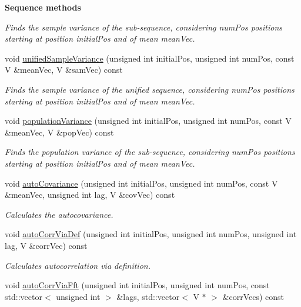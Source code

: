 \begin{Indent}{\bf Sequence methods}
\begin{DoxyCompactItemize}
\begin{DoxyCompactList}\small\item\em Finds the sample variance of the sub-\/sequence, considering {\ttfamily num\-Pos} positions starting at position {\ttfamily initial\-Pos} and of mean {\ttfamily mean\-Vec}. \end{DoxyCompactList}\item 
void \hyperlink{class_q_u_e_s_o_1_1_array_of_sequences_a51ad92656e8b2e437982660fabb67ba3}{unified\-Sample\-Variance} (unsigned int initial\-Pos, unsigned int num\-Pos, const V \&mean\-Vec, V \&sam\-Vec) const 
\begin{DoxyCompactList}\small\item\em Finds the sample variance of the unified sequence, considering {\ttfamily num\-Pos} positions starting at position {\ttfamily initial\-Pos} and of mean {\ttfamily mean\-Vec}. \end{DoxyCompactList}\item 
void \hyperlink{class_q_u_e_s_o_1_1_array_of_sequences_a5bde372f275a51cd25c883604586d6dd}{population\-Variance} (unsigned int initial\-Pos, unsigned int num\-Pos, const V \&mean\-Vec, V \&pop\-Vec) const 
\begin{DoxyCompactList}\small\item\em Finds the population variance of the sub-\/sequence, considering {\ttfamily num\-Pos} positions starting at position {\ttfamily initial\-Pos} and of mean {\ttfamily mean\-Vec}. \end{DoxyCompactList}\item 
void \hyperlink{class_q_u_e_s_o_1_1_array_of_sequences_ac6439fcb719bad4810cfe3c020f73486}{auto\-Covariance} (unsigned int initial\-Pos, unsigned int num\-Pos, const V \&mean\-Vec, unsigned int lag, V \&cov\-Vec) const 
\begin{DoxyCompactList}\small\item\em Calculates the autocovariance. \end{DoxyCompactList}\item 
void \hyperlink{class_q_u_e_s_o_1_1_array_of_sequences_a057921bf605783c85def57f71cc2101e}{auto\-Corr\-Via\-Def} (unsigned int initial\-Pos, unsigned int num\-Pos, unsigned int lag, V \&corr\-Vec) const 
\begin{DoxyCompactList}\small\item\em Calculates autocorrelation via definition. \end{DoxyCompactList}\item 
void \hyperlink{class_q_u_e_s_o_1_1_array_of_sequences_aa0468a432b6ee77a810357d0ef3b8690}{auto\-Corr\-Via\-Fft} (unsigned int initial\-Pos, unsigned int num\-Pos, const std\-::vector$<$ unsigned int $>$ \&lags, std\-::vector$<$ V $\ast$ $>$ \&corr\-Vecs) const 

\end{DoxyCompactItemize}
\end{Indent}

